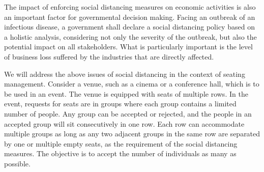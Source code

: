 The impact of enforcing social distancing measures on economic activities is also an important factor for governmental decision making. Facing an outbreak of an infectious disease, a government shall declare a social distancing policy based on a holistic analysis, considering not only the severity of the outbreak, but also the potential impact on all stakeholders. What is particularly important is the level of business loss suffered by the industries that are directly affected.  
 



We will address the above issues of social distancing in the context of seating management. Consider  a venue, such as a cinema or a conference hall, which is to be used in an event. The venue is equipped with seats of multiple rows. In the event, requests for seats are in groups where each group contains a limited number of people. Any group can be accepted or rejected, and the people in an accepted group  will sit consecutively in one row. Each row can accommodate multiple groups as long as any two adjacent groups in the same row are separated by one or multiple empty seats, as the requirement of the social distancing measures. The objective is to accept the number of individuals as many as possible.

